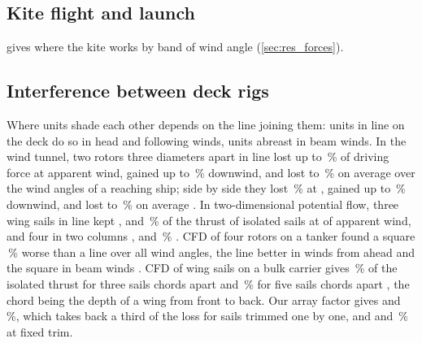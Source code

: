 \subsection{Kite flight and launch}
\label{app:kite_flight}

 gives where the kite works by band of wind angle (\cref{sec:res_forces}).

\begin{table}[tbp]
\centering
\footnotesize
\caption{ Where the kite works over the 28 cases with a kite, each with its cheapest size, by band of true wind angle: share of the time in the band, share of that time in which the kite could pull, is up and pulls, its mean thrust while up, lulls and upwind drag included, the share of the hours at each ship speed in which it could pull and in which it is up, the speed of the ship without a rig and of the kite ship in that band, and the lowest apparent wind angle (AWA) at which each rig pulls. A dash marks a ship speed the kite ship does not sail in that band. }
\label{tab:flight}
\end{table}

\subsection{Interference between deck rigs}
\label{app:interference}

Where units shade each other depends on the line joining them: units in line on the deck do so in head and following winds, units abreast in beam winds. In the wind tunnel, two rotors three diameters apart in line lost up to \,\% of driving force at  apparent wind, gained up to \,\% downwind, and lost  to \,\% on average over the wind angles of a reaching ship; side by side they lost \,\% at , gained up to \,\% downwind, and lost  to \,\% on average \citep{bordogna2020}. In two-dimensional potential flow, three wing sails in line kept ,  and \,\% of the thrust of isolated sails at  of apparent wind, and four in two columns ,  and \,\% \citep{vanreen2026}. CFD of four rotors on a tanker found a square \,\% worse than a line over all wind angles, the line better in winds from ahead and the square in beam winds \citep{guzelbulut2024arrangement}. CFD of wing sails on a bulk carrier gives \,\% of the isolated thrust for three sails  chords apart and \,\% for five sails  chords apart \citep{mboumba2022}, the chord being the depth of a wing from front to back. Our array factor gives  and \,\%, which takes back a third of the loss for sails trimmed one by one, and  and \,\% at fixed trim.


